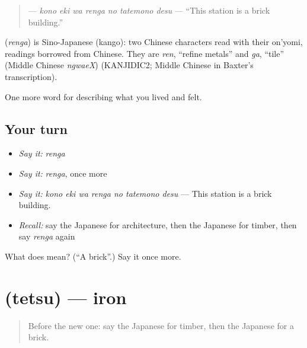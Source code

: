 \begin{quote}
\textbf{   } — \emph{kono eki wa renga no tatemono desu} — \textquotedblleft{}This station is a brick building.\textquotedblright{}
\end{quote}

\begin{cousinweb}
\textbf{} (\emph{renga}) is Sino-Japanese (kango): two Chinese characters read with their on'yomi, readings borrowed from Chinese. They are \emph{ren}, \textquotedblleft{}refine metals\textquotedblright{} and \emph{ga}, \textquotedblleft{}tile\textquotedblright{} (Middle Chinese \emph{ngwaeX}) (KANJIDIC2; Middle Chinese in Baxter's transcription).
\end{cousinweb}

\begin{grammarlens}[title={What you've built}]
One more word for describing what you lived and felt.
\end{grammarlens}

\subsection*{Your turn}
\begin{itemize}
\raggedright
  \item \emph{Say it:} \emph{renga}
  \item \emph{Say it:} \emph{renga}, once more
  \item \emph{Say it:} \emph{kono eki wa renga no tatemono desu} — This station is a brick building.
  \item \emph{Recall:} say the Japanese for architecture, then the Japanese for timber, then say \emph{renga} again
\end{itemize}

\begin{tcolorbox}[breakable,colback=teal!4,colframe=teal!35!black,title={Before you move on}]
What does  mean? (\textquotedblleft{}A brick\textquotedblright{}.) Say it once more.
\end{tcolorbox}
\section[\texorpdfstring{\ja{てつ} (tetsu)}{てつ (tetsu)}]{ (tetsu) — iron}

\label{lesson:JA-C488-tetsu}



\begin{quote}
Before the new one: say the Japanese for timber, then the Japanese for a brick.
\end{quote}

